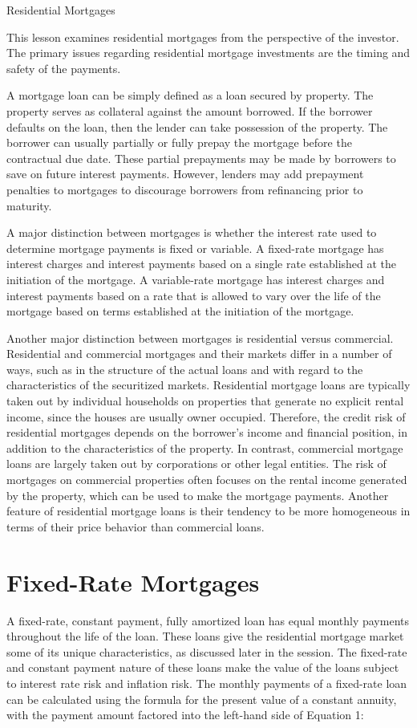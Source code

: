 \documentclass[11pt]{article}
\begin{document}
Residential Mortgages

This lesson examines residential mortgages from the perspective of the investor. The primary issues regarding residential mortgage investments are the timing and safety of the payments.

A mortgage loan can be simply defined as a loan secured by property. The property serves as collateral against the amount borrowed. If the borrower defaults on the loan, then the lender can take possession of the property. The borrower can usually partially or fully prepay the mortgage before the contractual due date. These partial prepayments may be made by borrowers to save on future interest payments. However, lenders may add prepayment penalties to mortgages to discourage borrowers from refinancing prior to maturity.

A major distinction between mortgages is whether the interest rate used to determine mortgage payments is fixed or variable. A fixed-rate mortgage has interest charges and interest payments based on a single rate established at the initiation of the mortgage. A variable-rate mortgage has interest charges and interest payments based on a rate that is allowed to vary over the life of the mortgage based on terms established at the initiation of the mortgage.

Another major distinction between mortgages is residential versus commercial. Residential and commercial mortgages and their markets differ in a number of ways, such as in the structure of the actual loans and with regard to the characteristics of the securitized markets. Residential mortgage loans are typically taken out by individual households on properties that generate no explicit rental income, since the houses are usually owner occupied. Therefore, the credit risk of residential mortgages depends on the borrower's income and financial position, in addition to the characteristics of the property. In contrast, commercial mortgage loans are largely taken out by corporations or other legal entities. The risk of mortgages on commercial properties often focuses on the rental income generated by the property, which can be used to make the mortgage payments. Another feature of residential mortgage loans is their tendency to be more homogeneous in terms of their price behavior than commercial loans.

\section*{Fixed-Rate Mortgages}
A fixed-rate, constant payment, fully amortized loan has equal monthly payments throughout the life of the loan. These loans give the residential mortgage market some of its unique characteristics, as discussed later in the session. The fixed-rate and constant payment nature of these loans make the value of the loans subject to interest rate risk and inflation risk. The monthly payments of a fixed-rate loan can be calculated using the formula for the present value of a constant annuity, with the payment amount factored into the left-hand side of Equation 1:
\end{document}

